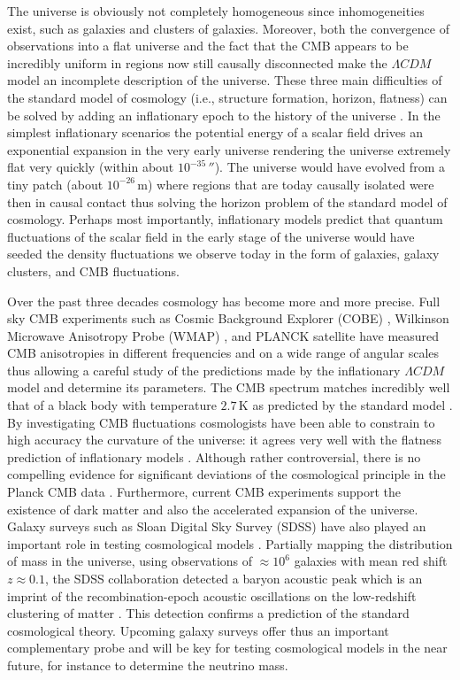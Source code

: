 The universe is obviously not completely homogeneous since inhomogeneities exist, such as galaxies and clusters of galaxies. Moreover, both the convergence of observations into a flat universe and the fact that the CMB appears to be incredibly uniform in regions now still causally disconnected  make the $\Lambda CDM$ model an incomplete description of the universe. These three main difficulties of the standard model of cosmology (i.e., structure formation, horizon, flatness) can be solved by adding an inflationary epoch to the history of the universe \cite{Guth:2005zr}. In the simplest inflationary scenarios the potential energy of a scalar field drives an exponential expansion in the very early universe rendering the universe extremely flat very quickly (within about $10^{-35}\, \second$). The universe would have evolved from a tiny patch (about $10^{-26}\,\mathrm{m}$) where regions that are today causally isolated were then in causal contact thus solving the horizon problem of the standard model of cosmology. Perhaps most importantly, inflationary models predict that quantum fluctuations of the scalar field in the early stage of the universe would have seeded the density fluctuations we observe today in the form of galaxies, galaxy clusters, and CMB fluctuations.

Over the past three decades cosmology has become more and more precise. Full sky CMB experiments such as Cosmic Background Explorer (COBE) \cite{Smoot:1992td}, Wilkinson Microwave Anisotropy Probe (WMAP) \cite{Bennett:2003bz}, and PLANCK satellite \cite{Ade:2013sjv} have measured CMB anisotropies in different frequencies and on a wide range of angular scales thus allowing a careful study of the predictions made by the inflationary $\Lambda CDM$ model and determine its parameters. The CMB spectrum matches incredibly well that of a black body with temperature $2.7\,\mathrm{K}$ as predicted by the standard model \cite{Alpher:1950zz}. By investigating CMB fluctuations cosmologists have been able to constrain to high accuracy the curvature of the universe: it agrees very well with the flatness prediction of inflationary models \cite{Ade:2015xua}. Although rather controversial, there is no compelling evidence for significant deviations of the cosmological principle in the Planck CMB data \cite{Ade:2015hxq}. Furthermore, current CMB experiments support the existence of dark matter and also the accelerated expansion of the universe. Galaxy surveys such as Sloan Digital Sky Survey (SDSS) have also played an important role in testing cosmological models \cite{Tegmark:2003uf,Tegmark:2003ud}. Partially mapping the distribution of mass in the universe, using observations of $\approx 10^6$ galaxies with mean red shift $z \approx 0.1$, the SDSS collaboration detected a baryon acoustic peak which is an imprint of the recombination-epoch acoustic oscillations on the low-redshift clustering of matter \cite{Eisenstein:2005su}. This detection confirms a prediction of the standard cosmological theory. Upcoming galaxy surveys offer thus an important complementary probe and will be key for testing cosmological models in the near future, for instance to determine the neutrino mass.

